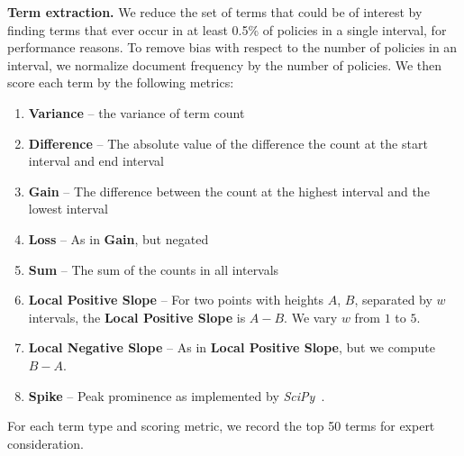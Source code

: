 {\textbf{Term extraction.}
\label{subsec:termextraction}
We reduce the set of terms that could be of interest by finding terms that ever occur in at least 0.5\% of policies in a single interval, for performance reasons. To remove bias with respect to the number of policies in an interval, we normalize document frequency by the number of policies. We then score each term by the following metrics:
\begin{enumerate}
    \item \textbf{Variance} -- the variance of term count
    \item \textbf{Difference} -- The absolute value of the difference the count at the start interval and end interval
    \item \textbf{Gain} -- The difference between the count at the highest interval and the lowest interval
    \item \textbf{Loss} -- As in \textbf{Gain}, but negated
    \item \textbf{Sum} -- The sum of the counts in all intervals
    \item \textbf{Local Positive Slope} -- For two points with heights $A$, $B$, separated by $w$ intervals, the \textbf{Local Positive Slope} is $A-B$. We vary $w$ from $1$ to $5$.
    \item \textbf{Local Negative Slope} -- As in \textbf{Local Positive Slope}, but we compute $B-A$.
    \item \textbf{Spike} -- Peak prominence as implemented by \emph{SciPy}~\cite{scipy-prominence}.
    
    \iffalse For any local maximum with value $B$, with local minima $A,C$ to the left and right, we score the prominence as $B-max(A,C)$, as implemented in SciPy~\cite{scipy-prominence}. The \textbf{Spike} score is the maximum prominence over all local maxima.\fi
    
\end{enumerate}
For each term type and scoring metric, we record the top 50 terms for expert consideration.
\iffalse
}
